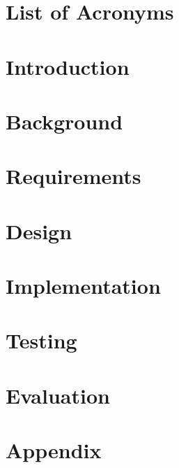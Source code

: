 \documentclass[a4paper]{report}
\begin{document}
\begin{abstract}
\end{abstract}

\tableofcontents

\chapter*{List of Acronyms}
\begin{acronym}
\end{acronym}


\chapter{Introduction}


\chapter{Background}


\chapter{Requirements}


\chapter{Design}


\chapter{Implementation}


\chapter{Testing}


\chapter{Evaluation}


\appendix
\chapter{Appendix}


\renewcommand\bibname{References}
\printbibliography{}
\end{document}
